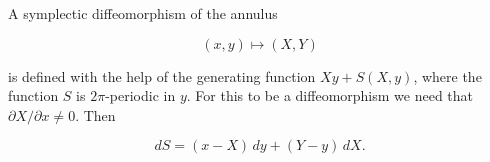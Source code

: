 A symplectic diffeomorphism of the annulus

$$(x, y) \mapsto (X, Y)$$

is defined with the help of the generating function $Xy + S(X, y)$, where the function $S$ is $2\pi$-periodic in $y$. For this to be a diffeomorphism we need that $\partial X / \partial x \neq 0$. Then

$$dS = (x - X)\,dy + (Y - y)\,dX.$$
